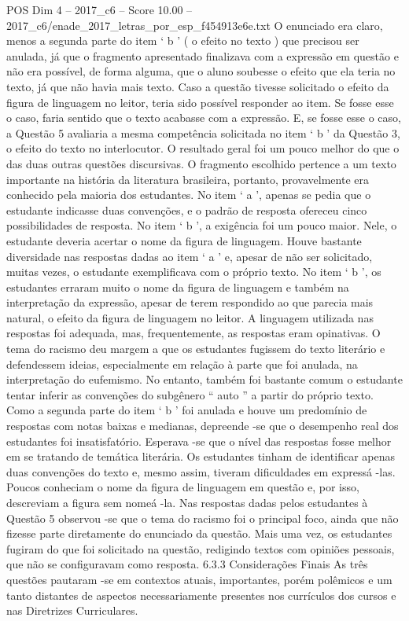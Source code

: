 \begin{textsample}{POS Dim 4 – 2017\_c6 – Score 10.00 – 2017\_c6/enade\_2017\_letras\_por\_esp\_f454913e6e.txt}
O enunciado era claro, menos a segunda parte do item ‘ b ’ ( o efeito no texto ) que precisou ser anulada, já que o fragmento apresentado finalizava com a expressão em questão e não era possível, de forma alguma, que o aluno soubesse o efeito que ela teria no texto, já que não havia mais texto.
Caso a questão tivesse solicitado o efeito da figura de linguagem no leitor, teria sido possível responder ao item.
Se fosse esse o caso, faria sentido que o texto acabasse com a expressão.
E, se fosse esse o caso, a Questão 5 avaliaria a mesma competência solicitada no item ‘ b ’ da Questão 3, o efeito do texto no interlocutor.
O resultado geral foi um pouco melhor do que o das duas outras questões discursivas.
O fragmento escolhido pertence a um texto importante na história da literatura brasileira, portanto, provavelmente era conhecido pela maioria dos estudantes.
No item ‘ a ’, apenas se pedia que o estudante indicasse duas convenções, e o padrão de resposta ofereceu cinco possibilidades de resposta.
No item ‘ b ’, a exigência foi um pouco maior.
Nele, o estudante deveria acertar o nome da figura de linguagem.
Houve bastante diversidade nas respostas dadas ao item ‘ a ’ e, apesar de não ser solicitado, muitas vezes, o estudante exemplificava com o próprio texto.
No item ‘ b ’, os estudantes erraram muito o nome da figura de linguagem e também na interpretação da expressão, apesar de terem respondido ao que parecia mais natural, o efeito da figura de linguagem no leitor.
A linguagem utilizada nas respostas foi adequada, mas, frequentemente, as respostas eram opinativas.
O tema do racismo deu margem a que os estudantes fugissem do texto literário e defendessem ideias, especialmente em relação à parte que foi anulada, na interpretação do eufemismo.
No entanto, também foi bastante comum o estudante tentar inferir as convenções do subgênero “ auto ” a partir do próprio texto.
Como a segunda parte do item ‘ b ’ foi anulada e houve um predomínio de respostas com notas baixas e medianas, depreende -se que o desempenho real dos estudantes foi insatisfatório.
Esperava -se que o nível das respostas fosse melhor em se tratando de temática literária.
Os estudantes tinham de identificar apenas duas convenções do texto e, mesmo assim, tiveram dificuldades em expressá -las.
Poucos conheciam o nome da figura de linguagem em questão e, por isso, descreviam a figura sem nomeá -la.
Nas respostas dadas pelos estudantes à Questão 5 observou -se que o tema do racismo foi o principal foco, ainda que não fizesse parte diretamente do enunciado da questão.
Mais uma vez, os estudantes fugiram do que foi solicitado na questão, redigindo textos com opiniões pessoais, que não se configuravam como resposta. 6.3.3 Considerações Finais As três questões pautaram -se em contextos atuais, importantes, porém polêmicos e um tanto distantes de aspectos necessariamente presentes nos currículos dos cursos e nas Diretrizes Curriculares.

\end{textsample}
